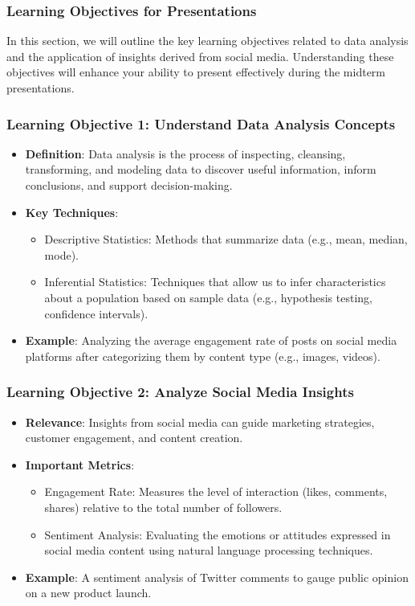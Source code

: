 \documentclass{beamer}
\begin{document}
\begin{frame}[fragile]
    \frametitle{Learning Objectives for Presentations}
    In this section, we will outline the key learning objectives related to data analysis and the application of insights derived from social media. Understanding these objectives will enhance your ability to present effectively during the midterm presentations.
\end{frame}

\begin{frame}[fragile]
    \frametitle{Learning Objective 1: Understand Data Analysis Concepts}
    \begin{itemize}
        \item \textbf{Definition}: Data analysis is the process of inspecting, cleansing, transforming, and modeling data to discover useful information, inform conclusions, and support decision-making.
        \item \textbf{Key Techniques}:
        \begin{itemize}
            \item Descriptive Statistics: Methods that summarize data (e.g., mean, median, mode).
            \item Inferential Statistics: Techniques that allow us to infer characteristics about a population based on sample data (e.g., hypothesis testing, confidence intervals).
        \end{itemize}
        \item \textbf{Example}: Analyzing the average engagement rate of posts on social media platforms after categorizing them by content type (e.g., images, videos).
    \end{itemize}
\end{frame}

\begin{frame}[fragile]
    \frametitle{Learning Objective 2: Analyze Social Media Insights}
    \begin{itemize}
        \item \textbf{Relevance}: Insights from social media can guide marketing strategies, customer engagement, and content creation.
        \item \textbf{Important Metrics}:
        \begin{itemize}
            \item Engagement Rate: Measures the level of interaction (likes, comments, shares) relative to the total number of followers.
            \item Sentiment Analysis: Evaluating the emotions or attitudes expressed in social media content using natural language processing techniques.
        \end{itemize}
        \item \textbf{Example}: A sentiment analysis of Twitter comments to gauge public opinion on a new product launch.
    \end{itemize}
\end{frame}
\end{document}

